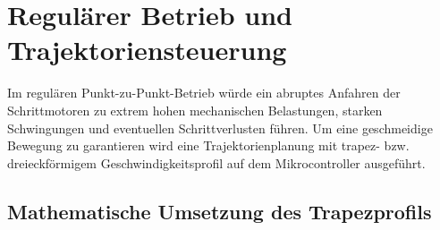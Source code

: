 %


%	  
\section{Regulärer Betrieb und Trajektoriensteuerung}
\label{sec:regulaerer_betrieb}

Im regulären Punkt-zu-Punkt-Betrieb würde ein abruptes Anfahren der Schrittmotoren zu extrem hohen mechanischen Belastungen, starken Schwingungen und eventuellen Schrittverlusten führen. Um eine geschmeidige Bewegung zu garantieren wird eine Trajektorienplanung mit trapez- bzw. dreieckförmigem Geschwindigkeitsprofil auf dem Mikrocontroller ausgeführt.

\subsection{Mathematische Umsetzung des Trapezprofils}
\label{subsec:math_trapez}

